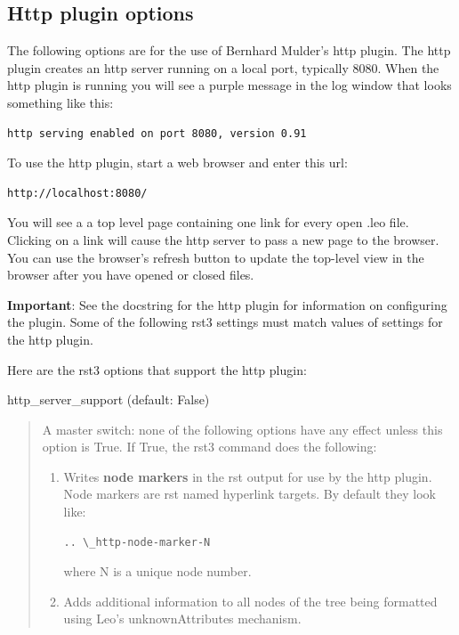 \documentclass[a4paper,10pt,english]{sphinxmanual}
\begin{document}
\subsection{Http plugin options}
\label{rstplugin3:http-plugin-options}
The following options are for the use of Bernhard Mulder's http plugin. The http
plugin creates an http server running on a local port, typically 8080. When the
http plugin is running you will see a purple message in the log window that
looks something like this:

\begin{Verbatim}[commandchars=\\\{\}]
http serving enabled on port 8080, version 0.91
\end{Verbatim}

To use the http plugin, start a web browser and enter this url:

\begin{Verbatim}[commandchars=\\\{\}]
http://localhost:8080/
\end{Verbatim}

You will see a a top level page containing one link for every open .leo file.
Clicking on a link will cause the http server to pass a new page to the browser.
You can use the browser's refresh button to update the top-level view in the
browser after you have opened or closed files.

\textbf{Important}: See the docstring for the http plugin for information on
configuring the plugin. Some of the following rst3 settings must match values of
settings for the http plugin.

Here are the rst3 options that support the http plugin:
\begin{description}
\end{description}

http\_server\_support (default: False)
\begin{quote}

A master switch: none of the following options have any effect unless this
option is True. If True, the rst3 command does the following:
\begin{enumerate}
\item {} 
Writes \textbf{node markers} in the rst output for use by the http plugin.
Node markers are rst named hyperlink targets. By default they look like:

\begin{Verbatim}[commandchars=\\\{\}]
.. \_http-node-marker-N
\end{Verbatim}

where N is a unique node number.

\item {} 
Adds additional information to all nodes of the tree being formatted using
Leo's unknownAttributes mechanism.

\end{enumerate}
\end{quote}
\end{document}

